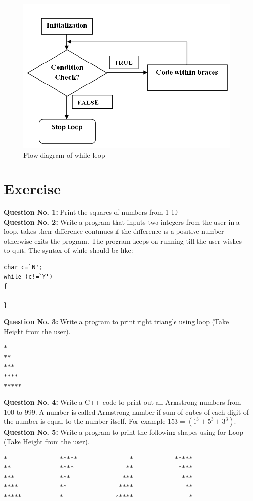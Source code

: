 \documentclass[12pt,a4paper]{article}
\begin{document}
\begin{figure}[H]
\centering
\label{While-Loop-Flow-Diagram}
\includegraphics[width=1.0\textwidth]{FlowDiagramWhileLoop.png}
\caption{Flow diagram of while loop}
\end{figure}

\section{Exercise}
\textbf{Question No. 1:} Print the squares of numbers from 1-10\\
\noindent\textbf{Question No. 2:} Write a program that inputs two integers from the user in a loop, takes their difference continues if the difference is a positive number otherwise exits the program. The program keeps on running till the user wishes to quit. 
The syntax of while should be like:
\begin{verbatim}
char c=`N';
while (c!=`Y')
{

}
\end{verbatim}
\noindent\textbf{Question No. 3:} Write a program to print right triangle using loop (Take Height from the user).
\begin{verbatim}
*
**
***
****
*****
\end{verbatim}
\noindent\textbf{Question No. 4:} Write a C++ code to print out all Armstrong numbers from 100 to 999. A number is called Armstrong number if sum of cubes of each digit of the number is equal to the number itself. For example $153=(1^3+5^3+3^3)$.\\
\noindent\textbf{Question No. 5:} Write a program to print the following shapes using for Loop (Take Height from the user). 

\begin{verbatim}
*           	*****               *       	 *****
**          	****               **       	  ****
***         	***               ***       	   ***
****        	**               ****       	    **
*****       	*               *****       	     *
\end{verbatim}
\end{document}
